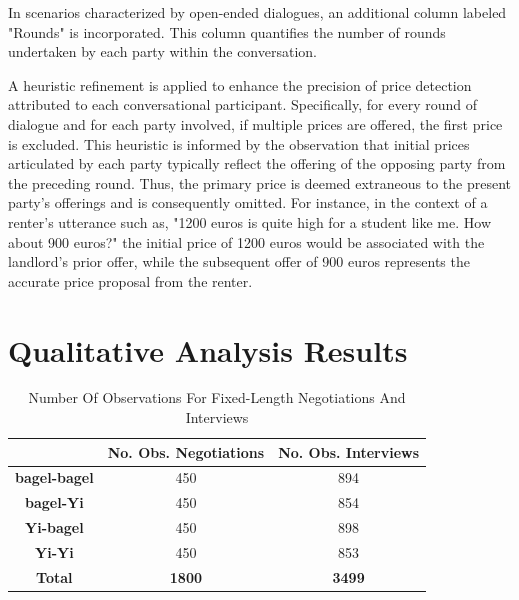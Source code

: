 \documentclass[runningheads]{llncs}
\begin{document}
In scenarios characterized by open-ended dialogues, an additional column labeled "Rounds" is incorporated. This column quantifies the number of rounds undertaken by each party within the conversation.

A heuristic refinement is applied to enhance the precision of price detection attributed to each conversational participant. Specifically, for every round of dialogue and for each party involved, if multiple prices are offered, the first price is excluded. This heuristic is informed by the observation that initial prices articulated by each party typically reflect the offering of the opposing party from the preceding round. Thus, the primary price is deemed extraneous to the present party's offerings and is consequently omitted. For instance, in the context of a renter's utterance such as, "1200 euros is quite high for a student like me. How about 900 euros?" the initial price of 1200 euros would be associated with the landlord's prior offer, while the subsequent offer of 900 euros represents the accurate price proposal from the renter.

\newpage
\section{Qualitative Analysis Results}

\begin{table}[h]
\centering
\caption{Number Of Observations For Fixed-Length Negotiations And Interviews}\label{tab:no_obs}
\begin{tabular}{|c|c|c|}
\hline
                     & \textbf{No. Obs. Negotiations} & \textbf{No. Obs. Interviews} \\ \hline
\textbf{bagel-bagel} & 450                            & 894                          \\ \hline
\textbf{bagel-Yi}    & 450                            & 854                          \\ \hline
\textbf{Yi-bagel}    & 450                            & 898                          \\ \hline
\textbf{Yi-Yi}       & 450                            & 853                          \\ \hline
\textbf{Total}       & \textbf{1800}                  & \textbf{3499}                \\ \hline
\end{tabular}
\end{table}
\end{document}
